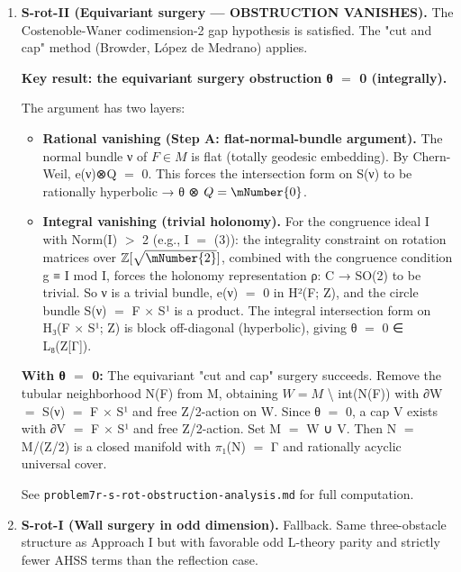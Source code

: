 \begin{enumerate}
\def\labelenumi{\arabic{enumi}.}
\item
  \textbf{S-rot-II (Equivariant surgery --- OBSTRUCTION VANISHES).}
  The Costenoble-Waner codimension-2 gap hypothesis is satisfied. The "cut
  and cap" method (Browder, López de Medrano) applies.

  \textbf{Key result: the equivariant surgery obstruction θ \(=\) 0 (integrally).}

  The argument has two layers:

  \begin{itemize}
  \item
    \textbf{Rational vanishing (Step A: flat-normal-bundle argument).} The
    normal bundle ν of \(F \in M\) is flat (totally geodesic embedding). By
    Chern-Weil, e(ν)⊗Q \(=\) 0. This forces the intersection form on S(ν)
    to be rationally hyperbolic → θ ⊗ \(Q = \mNumber{0}\).
  \item
    \textbf{Integral vanishing (trivial holonomy).} For the congruence ideal
    I with Norm(I) \(>\) 2 (e.g., I \(=\) (3)): the integrality constraint on
    rotation matrices over \(\mathbb{Z}[\sqrt{\mNumber{2}}]\), combined with the congruence condition
    g ≡ I mod I, forces the holonomy representation ρ: C → SO(2) to be
    trivial. So ν is a trivial bundle, e(ν) \(=\) 0 in H²(F; Z), and the
    circle bundle S(ν) \(=\) F × S¹ is a product. The integral intersection
    form on H₃(F \(\times\) S¹; Z) is block off-diagonal (hyperbolic), giving
    θ \(=\) 0 ∈ L₈(Z{[}Γ{]}).
  \end{itemize}

  \textbf{With θ \(=\) 0:} The equivariant "cut and cap" surgery succeeds. Remove
  the tubular neighborhood N(F) from M, obtaining \(W = M\) \textbackslash{} int(N(F)) with
  ∂W \(=\) S(ν) \(=\) F \(\times\) S¹ and free Z/2-action on W. Since θ \(=\) 0, a cap V
  exists with ∂V \(=\) F \(\times\) S¹ and free Z/2-action. Set M\textquotesingle{} \(=\) W ∪ V. Then
  N \(=\) M\textquotesingle/(Z/2) is a closed manifold with \(\pi\)₁(N) \(=\) Γ and rationally
  acyclic universal cover.

  See \texttt{problem7r-s-rot-obstruction-analysis.md} for full computation.
\item
  \textbf{S-rot-I (Wall surgery in odd dimension).} Fallback. Same three-obstacle
  structure as Approach I but with favorable odd L-theory parity and
  strictly fewer AHSS terms than the reflection case.
\end{enumerate}

